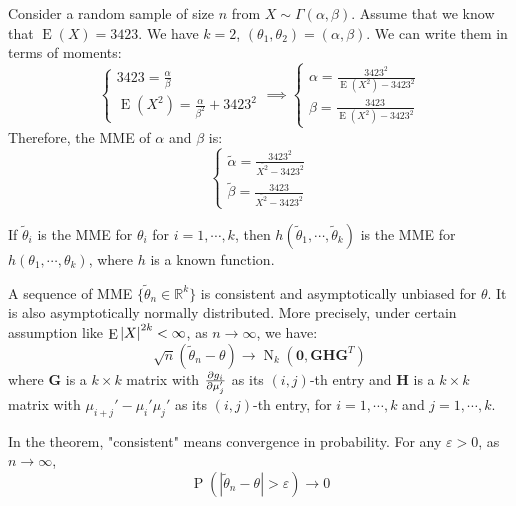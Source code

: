 \documentclass{huhtakm-template-book-v2}
\DeclareMathOperator{\prob}{P}
\DeclareMathOperator{\E}{E}
\DeclareMathOperator{\N}{N}
\begin{document}
\begin{eg}
	Consider a random sample of size $n$ from $X\sim\Gamma(\alpha,\beta)$. Assume that we know that $\E(X)=3423$. We have $k=2$, $(\theta_{1},\theta_{2})=(\alpha,\beta)$. We can write them in terms of moments:
	\begin{equation*}
		\begin{cases}
			3423=\frac{\alpha}{\beta}\\
			\E(X^{2})=\frac{\alpha}{\beta^{2}}+3423^{2}
		\end{cases}\implies\begin{cases}
			\alpha=\frac{3423^{2}}{\E(X^{2})-3423^{2}}\\
			\beta=\frac{3423}{\E(X^{2})-3423^{2}}
		\end{cases}
	\end{equation*}
	Therefore, the MME of $\alpha$ and $\beta$ is:
	\begin{equation*}
		\begin{cases}
			\tilde{\alpha}=\frac{3423^{2}}{\overline{X^{2}}-3423^{2}}\\
			\tilde{\beta}=\frac{3423}{\overline{X^{2}}-3423^{2}}
		\end{cases}
	\end{equation*}
\end{eg}
\begin{lem}
	If $\tilde{\theta}_{i}$ is the MME for $\theta_{i}$ for $i=1,\cdots,k$, then $h(\tilde{\theta}_{1},\cdots,\tilde{\theta}_{k})$ is the MME for $h(\theta_{1},\cdots,\theta_{k})$, where $h$ is a known function.
\end{lem}
\begin{thm}
	\label{Chapter 2 (Thoerem) Sequence of MME is asympt. normal}
	A sequence of MME $\{\tilde{\theta}_{n}\in\mathbb{R}^{k}\}$ is consistent and asymptotically unbiased for $\theta$. It is also asymptotically normally distributed. More precisely, under certain assumption like $\E\abs{X}^{2k}<\infty$, as $n\to\infty$, we have:
	\begin{equation*}
		\sqrt{n}(\tilde{\theta}_{n}-\theta)\to\N_{k}(\mathbf{0},\mathbf{GHG}^{T})
	\end{equation*}
	where $\mathbf{G}$ is a $k\times k$ matrix with $\pdv{g_{i}}{\mu_{j}'}$ as its $(i,j)$-th entry and $\mathbf{H}$ is a $k\times k$ matrix with $\mu_{i+j}'-\mu_{i}'\mu_{j}'$ as its $(i,j)$-th entry, for $i=1,\cdots,k$ and $j=1,\cdots,k$.
\end{thm}
\begin{rem}
	In the theorem, "consistent" means convergence in probability. For any $\varepsilon>0$, as $n\to\infty$,
	\begin{equation*}
		\prob(|\tilde{\theta}_{n}-\theta|>\varepsilon)\to 0
	\end{equation*}
\end{rem}
\end{document}
